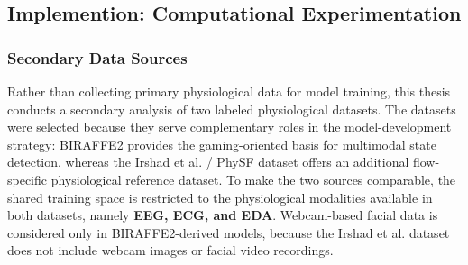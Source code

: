\subsection{Implemention: Computational Experimentation}

\subsubsection{Secondary Data Sources}
Rather than collecting primary physiological data for model training, this thesis conducts a secondary analysis of two labeled physiological datasets. The datasets were selected because they serve complementary roles in the model-development strategy: BIRAFFE2 provides the gaming-oriented basis for multimodal state detection, whereas the Irshad et al. / PhySF dataset offers an additional flow-specific physiological reference dataset. To make the two sources comparable, the shared training space is restricted to the physiological modalities available in both datasets, namely \textbf{EEG, ECG, and EDA}. Webcam-based facial data is considered only in BIRAFFE2-derived models, because the Irshad et al. dataset does not include webcam images or facial video recordings.

